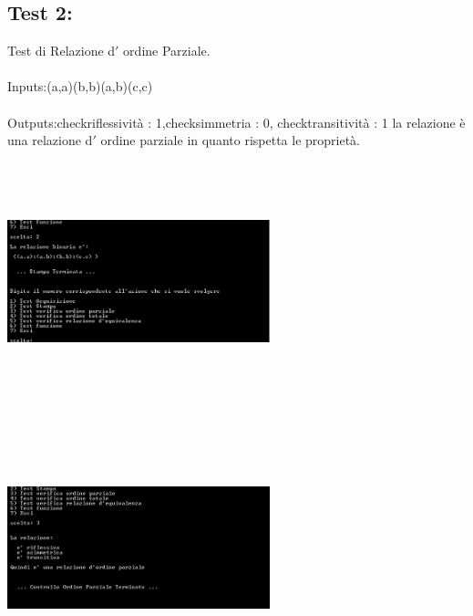\documentclass[11pt, a4paper, titlepage, block]{article}
\begin{document}
	\subsection{Test 2:}
	Test di Relazione d$'$ ordine Parziale.\\
	\\
	Inputs:(a,a)(b,b)(a,b)(c,c)\\
	\\
	Outputs:checkriflessivit\`a : 1,checksimmetria : 0, checktransitivit\`a : 1
	la relazione \`e una relazione d$'$ ordine parziale in quanto rispetta le propriet\`a.\\
	\includegraphics[width=3in,height=3in,viewport=0 0 300 300]{../Screenshots/Test2Input.png}
	\\
	\includegraphics[width=3in,height=3in,viewport=0 0 300 300]{../Screenshots/Test2Output.png}
	\\
	\\
	\newpage
\end{document}
